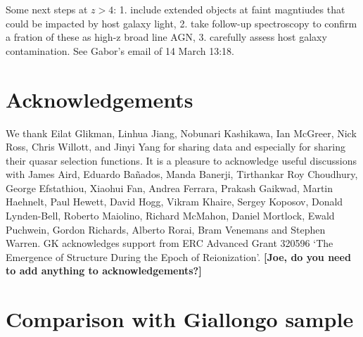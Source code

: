 \documentclass[a4paper,fleqn,usenatbib]{mnras}
\newcommand{\gk}[1]{{\bf \color{notecolor} [#1]}}
\begin{document}
Some next steps at $z>4$: 1. include extended objects at faint
magntiudes that could be impacted by host galaxy light, 2. take
follow-up spectroscopy to confirm a fration of these as high-z broad
line AGN, 3. carefully assess host galaxy contamination.  See Gabor's
email of 14 March 13:18.

\section*{Acknowledgements}

We thank Eilat Glikman, Linhua Jiang, Nobunari Kashi\-kawa, Ian
McGreer, Nick Ross, Chris Willott, and Jinyi Yang for sharing data and
especially for sharing their quasar selection functions.  It is a
pleasure to acknowledge useful discussions with James Aird, Eduardo
Ba\~nados, Manda Banerji, Tirthankar Roy Choudhury, George Efstathiou,
Xiaohui Fan, Andrea Ferrara, Prakash Gaikwad, Martin Haehnelt, Paul
Hewett, David Hogg, Vikram Khaire, Sergey Koposov, Donald Lynden-Bell,
Roberto Maiolino, Richard McMahon, Daniel Mortlock, Ewald Puchwein,
Gordon Richards, Alberto Rorai, Bram Venemans and Stephen Warren.  GK
acknowledges support from ERC Advanced Grant 320596 `The Emergence of
Structure During the Epoch of Reionization'. \gk{Joe, do you need to
  add anything to acknowledgements?}

\appendix

\section{Comparison with Giallongo sample}
\label{sec:conv}
\end{document}
